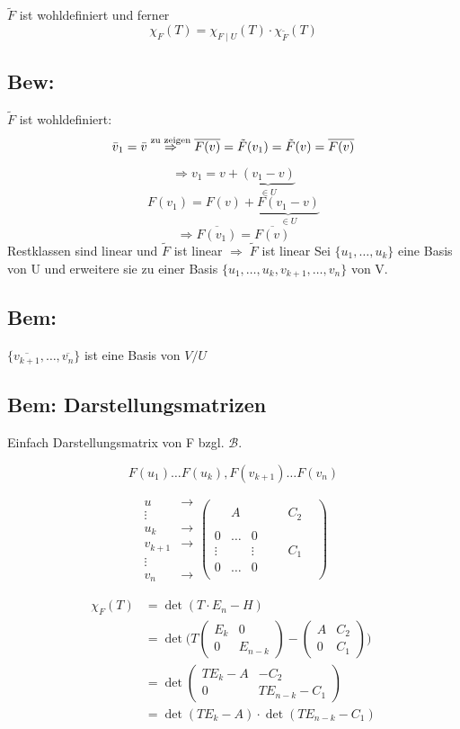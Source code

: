 \documentclass[titlepage,12pt,a4paper,ngerman]{report}
\newcommand{\tx}[1]{\textrm{#1}}
\begin{document}
$\tilde{F}$ ist wohldefiniert und ferner
$$\chi_F(T) = \chi_{F \mid U} (T) \cdot \chi_{\tilde{F}} (T)$$
\subsection{Bew:}
$\tilde{F}$ ist wohldefiniert:
$$\bar{v}_1 = \bar{v} \buildrel \tx{zu zeigen} \over \Rightarrow \overline{F(v)} = \tilde{F}(v_1) = \tilde{F}(v) = \overline{F(v)}$$

$$\Rightarrow v_1 = v + \underbrace{(v_1-v)}_{\in U}$$
$$ F(v_1) = F(v) + \underbrace{F(v_1 - v)}_{\in U}$$
$$\Rightarrow \overline{F(v_1)} = \overline{F(v)}$$
Restklassen sind linear und $\tilde{F}$ ist linear $\Rightarrow\; \tilde{F}$ ist linear
Sei $\{u_1,\dots,u_k\}$ eine Basis von U und erweitere sie zu einer Basis $\{u_1,\dots,u_k, v_{k+1}, \dots, v_n\}$ von V.
\subsection{Bem:}
$\{\overline{v_{k+1}},\dots,\overline{v_n}\}$ ist eine Basis von $V/U$ 
\subsection{Bem: Darstellungsmatrizen}
Einfach Darstellungsmatrix von F bzgl. $\mathcal{B}$.

\pagebreak
$$F(u_1) \dots F(u_k), F(v_{k+1}) \dots F(v_n)$$ 
\nopagebreak

$$\begin{matrix}
u & \rightarrow\\
\vdots \\
u_k & \rightarrow\\
v_{k+1} & \rightarrow\\
\vdots \\
v_n & \rightarrow
\end{matrix}
\begin{pmatrix}
& & & \\
& A & & & & C_2\\
& & & & \\
0 & \dots & 0 & &  \\
\vdots & & \vdots & & & C_1 & \\
0 & \dots & 0 & & & \\
\end{pmatrix} $$

\begin{align*}
\chi_F(T) &= \det(T\cdot E_n - H) \\
&= \det\bigg( T \begin{pmatrix}
E_k & 0 \\
0 & E_{n-k}
\end{pmatrix} - \begin{pmatrix}
A & C_2 \\
0 & C_1 
\end{pmatrix} \bigg)\\
&= \det\begin{pmatrix}
TE_k-A & -C_2 \\
0 & TE_{n-k} - C_1
\end{pmatrix} \\
&= \det(TE_k-A) \cdot \det(TE_{n-k} - C_1)
\end{align*}
\end{document}
